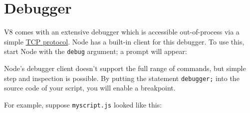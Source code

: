 \section{Debugger}\label{debugger}

\begin{Shaded}
\begin{Highlighting}[]
 
\end{Highlighting}
\end{Shaded}

V8 comes with an extensive debugger which is accessible out-of-process
via a simple
\href{http://code.google.com/p/v8/wiki/DebuggerProtocol}{TCP protocol}.
Node has a built-in client for this debugger. To use this, start Node
with the \texttt{debug} argument; a prompt will appear:

\begin{Shaded}
\end{Shaded}

Node's debugger client doesn't support the full range of commands, but
simple step and inspection is possible. By putting the statement
\texttt{debugger;} into the source code of your script, you will enable
a breakpoint.

For example, suppose \texttt{myscript.js} looked like this:

\begin{Shaded}
\begin{Highlighting}[]
\NormalTok{;}
\NormalTok{(} \NormalTok{() \{}
  \NormalTok{;}
  \NormalTok{(}\NormalTok{);}
\NormalTok{\}, }\NormalTok{);}
\NormalTok{(}\NormalTok{);}
\end{Highlighting}
\end{Shaded}

